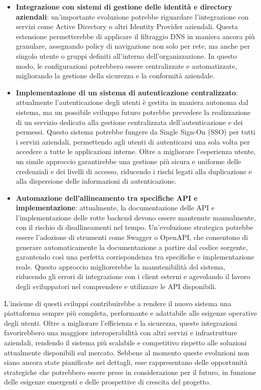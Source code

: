 \begin{itemize}
  \item \textbf{Integrazione con sistemi di gestione delle identità e directory aziendali}: un'importante evoluzione potrebbe riguardare l'integrazione con servizi come Active Directory o altri Identity Provider aziendali. Questa estensione permetterebbe di applicare il filtraggio DNS in maniera ancora più granulare, assegnando policy di navigazione non solo per rete, ma anche per singolo utente o gruppi definiti all’interno dell’organizzazione. In questo modo, le configurazioni potrebbero essere centralizzate e automatizzate, migliorando la gestione della sicurezza e la conformità aziendale.

  \item \textbf{Implementazione di un sistema di autenticazione centralizzato}: attualmente l’autenticazione degli utenti è gestita in maniera autonoma dal sistema, ma un possibile sviluppo futuro potrebbe prevedere la realizzazione di un servizio dedicato alla gestione centralizzata dell'autenticazione e dei permessi. Questo sistema potrebbe fungere da Single Sign-On (SSO) per tutti i servizi aziendali, permettendo agli utenti di autenticarsi una sola volta per accedere a tutte le applicazioni interne. Oltre a migliorare l’esperienza utente, un simile approccio garantirebbe una gestione più sicura e uniforme delle credenziali e dei livelli di accesso, riducendo i rischi legati alla duplicazione e alla dispersione delle informazioni di autenticazione.

  \item \textbf{Automazione dell’allineamento tra specifiche API e implementazione}: attualmente, la documentazione delle API e l’implementazione delle rotte backend devono essere mantenute manualmente, con il rischio di disallineamenti nel tempo. Un'evoluzione strategica potrebbe essere l'adozione di strumenti come Swagger o OpenAPI, che consentono di generare automaticamente la documentazione a partire dal codice sorgente, garantendo così una perfetta corrispondenza tra specifiche e implementazione reale. Questo approccio migliorerebbe la manutenibilità del sistema, riducendo gli errori di integrazione con i client esterni e agevolando il lavoro degli sviluppatori nel comprendere e utilizzare le API disponibili.
\end{itemize}

L’insieme di questi sviluppi contribuirebbe a rendere il nuovo sistema una piattaforma sempre più completa, performante e adattabile alle esigenze operative degli utenti. Oltre a migliorare l’efficienza e la sicurezza, queste integrazioni favorirebbero una maggiore interoperabilità con altri servizi e infrastrutture aziendali, rendendo il sistema più scalabile e competitivo rispetto alle soluzioni attualmente disponibili sul mercato. Sebbene al momento queste evoluzioni non siano ancora state pianificate nei dettagli, esse rappresentano delle opportunità strategiche che potrebbero essere prese in considerazione per il futuro, in funzione delle esigenze emergenti e delle prospettive di crescita del progetto.
